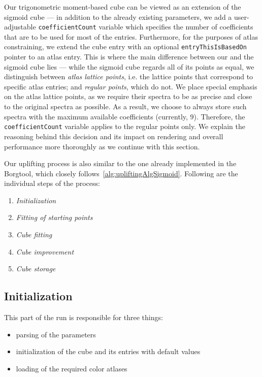 Our trigonometric moment-based cube can be viewed as an extension of the sigmoid cube --- in addition to the already existing parameters, we add a user-adjustable \texttt{coefficientCount} variable which specifies the number of coefficients that are to be used for most of the entries. Furthermore, for the purposes of atlas constraining, we extend the cube entry with an optional \texttt{entryThisIsBasedOn} pointer to an atlas entry. This is where the main difference between our and the sigmoid cube lies --- while the sigmoid cube regards all of its points as equal, we distinguish between \emph{atlas lattice points}, i.e. the lattice points that correspond to specific atlas entries; and \emph{regular points}, which do not. We place special emphasis on the atlas lattice points, as we require their spectra to be as precise and close to the original spectra as possible. As a result, we choose to always store such spectra with the maximum available coefficients (currently, $9$). Therefore, the \texttt{coefficientCount} variable applies to the regular points only. We explain the reasoning behind this decision and its impact on rendering and overall performance more thoroughly as we continue with this section.

Our uplifting process is also similar to the one already implemented in the Borgtool, which closely follows~\cref{alg:upliftingAlgSigmoid}. Following are the individual steps of the process:
\begin{enumerate}
	\item \emph{Initialization}
	\item \emph{Fitting of starting points}
	\item \emph{Cube fitting}
	\item \emph{Cube improvement}
	\item \emph{Cube storage}
\end{enumerate}

\subsection{Initialization}

This part of the run is responsible for three things:
\begin{itemize}
	\item parsing of the parameters
	\item initialization of the cube and its entries with default values
	\item loading of the required color atlases
\end{itemize}

